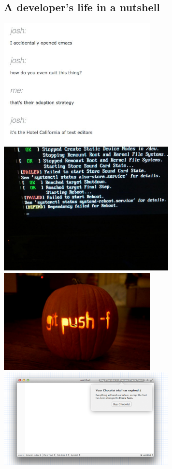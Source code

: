 \documentclass{42-en}
\begin{document}
    \subsection{A developer's life in a nutshell}
    \includegraphics[width=8cm]{./1.jpeg}
    \includegraphics[width=9cm]{./2.jpeg}
    \includegraphics[width=8cm]{./3.png}
    \includegraphics[width=9cm]{./4.png}
\end{document}
